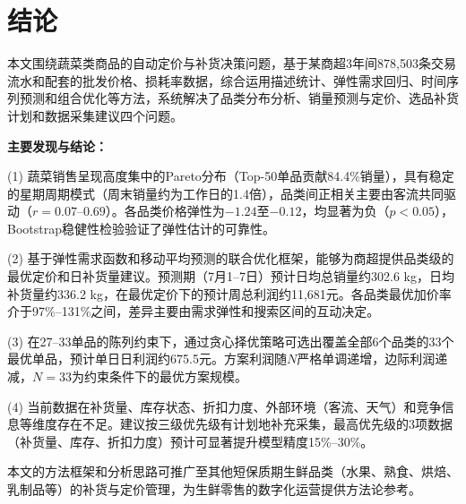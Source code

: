 \documentclass[12pt,a4paper]{ctexart}
\begin{document}
\section{结论}

本文围绕蔬菜类商品的自动定价与补货决策问题，基于某商超3年间878,503条交易流水和配套的批发价格、损耗率数据，综合运用描述统计、弹性需求回归、时间序列预测和组合优化等方法，系统解决了品类分布分析、销量预测与定价、选品补货计划和数据采集建议四个问题。

\textbf{主要发现与结论：}

(1) 蔬菜销售呈现高度集中的Pareto分布（Top-50单品贡献84.4\%销量），具有稳定的星期周期模式（周末销量约为工作日的1.4倍），品类间正相关主要由客流共同驱动（$r=0.07$--$0.69$）。各品类价格弹性为$-1.24$至$-0.12$，均显著为负（$p<0.05$），Bootstrap稳健性检验验证了弹性估计的可靠性。

(2) 基于弹性需求函数和移动平均预测的联合优化框架，能够为商超提供品类级的最优定价和日补货量建议。预测期（7月1--7日）预计日均总销量约302.6 kg，日均补货量约336.2 kg，在最优定价下的预计周总利润约11,681元。各品类最优加价率介于97\%--131\%之间，差异主要由需求弹性和搜索区间的互动决定。

(3) 在27--33单品的陈列约束下，通过贪心择优策略可选出覆盖全部6个品类的33个最优单品，预计单日日利润约675.5元。方案利润随$N$严格单调递增，边际利润递减，$N=33$为约束条件下的最优方案规模。

(4) 当前数据在补货量、库存状态、折扣力度、外部环境（客流、天气）和竞争信息等维度存在不足。建议按三级优先级有计划地补充采集，最高优先级的3项数据（补货量、库存、折扣力度）预计可显著提升模型精度15\%--30\%。

本文的方法框架和分析思路可推广至其他短保质期生鲜品类（水果、熟食、烘焙、乳制品等）的补货与定价管理，为生鲜零售的数字化运营提供方法论参考。

\newpage
\end{document}
